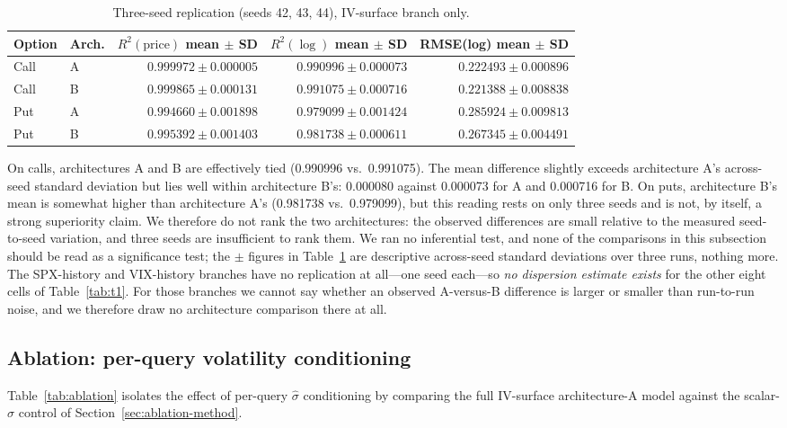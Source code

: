\documentclass[11pt]{article}
\begin{document}
\begin{table}[t]
\centering
\small
\caption{Three-seed replication (seeds 42, 43, 44), IV-surface branch only.}
\label{tab:replication}
\begin{tabular}{llrrr}
\toprule
Option & Arch. & $R^2(\text{price})$ mean $\pm$ SD & $R^2(\log)$ mean $\pm$ SD & RMSE(log) mean $\pm$ SD \\
\midrule
Call & A & $0.999972 \pm 0.000005$ & $0.990996 \pm 0.000073$ & $0.222493 \pm 0.000896$ \\
Call & B & $0.999865 \pm 0.000131$ & $0.991075 \pm 0.000716$ & $0.221388 \pm 0.008838$ \\
Put  & A & $0.994660 \pm 0.001898$ & $0.979099 \pm 0.001424$ & $0.285924 \pm 0.009813$ \\
Put  & B & $0.995392 \pm 0.001403$ & $0.981738 \pm 0.000611$ & $0.267345 \pm 0.004491$ \\
\bottomrule
\end{tabular}
\end{table}

On calls, architectures A and B are effectively tied (0.990996 vs.\ 0.991075). The mean difference
slightly exceeds architecture A's across-seed standard deviation but lies well within architecture
B's: 0.000080 against 0.000073 for A and 0.000716 for B. On puts, architecture B's mean is somewhat
higher than architecture A's (0.981738 vs.\ 0.979099), but this reading rests on only three seeds and
is not, by itself, a strong superiority claim. We therefore do not rank the two architectures: the
observed differences are small relative to the measured seed-to-seed variation, and three seeds are
insufficient to rank them. We ran no inferential test, and none of the comparisons in this subsection
should be read as a significance test; the $\pm$ figures in Table~\ref{tab:replication} are descriptive
across-seed standard deviations over three runs, nothing more. The SPX-history and VIX-history branches
have no replication at all---one seed each---so \emph{no dispersion estimate exists} for the other
eight cells of Table~\ref{tab:t1}. For those branches we cannot say whether an observed A-versus-B
difference is larger or smaller than run-to-run noise, and we therefore draw no architecture comparison
there at all.

\subsection{Ablation: per-query volatility conditioning}
\label{sec:results-ablation}
Table~\ref{tab:ablation} isolates the effect of per-query $\hat\sigma$ conditioning by comparing the
full IV-surface architecture-A model against the scalar-$\hat\sigma$ control of
Section~\ref{sec:ablation-method}.
\end{document}
